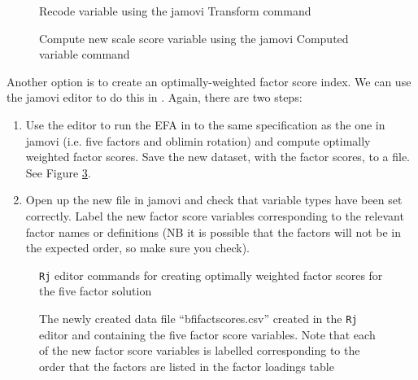 \begin{figure}[!htb]
\begin{center}
\caption{Recode variable using the jamovi Transform command}
\label{fig:fa8}
\HR
\end{center}
\end{figure}

\begin{figure}[!htb]
\begin{center}
\caption{Compute new scale score variable using the jamovi Computed variable command}
\label{fig:fa9}
\HR
\end{center}
\end{figure}

Another option is to create an optimally-weighted factor score index. We can use the jamovi  editor to do this in . Again, there are two steps:

\begin{enumerate} \itemsep -2pt
\item Use the  editor to run the EFA in  to the same specification as the one in jamovi (i.e. five factors and oblimin rotation) and compute optimally weighted factor scores. Save the new dataset, with the factor scores, to a file. See Figure \ref{fig:fa10}.
\item Open up the new file in jamovi and check that variable types have been set correctly. Label the new factor score variables corresponding to the relevant factor names or definitions (NB it is possible that the factors will not be in the expected order, so make sure you check).
\end{enumerate}

\begin{figure}[!htp]
\begin{center}
\caption{\texttt{Rj} editor commands for creating optimally weighted factor scores for the five factor solution}
\label{fig:fa10}
\HR
\end{center}
\end{figure}

\begin{figure}[!htp]
\begin{center}
\caption{The newly created data file “bfifactscores.csv” created in the \texttt{Rj} editor and containing the five factor score variables. Note that each of the new factor score variables is labelled corresponding to the order that the factors are listed in the factor loadings table}
\label{fig:fa11}
\HR
\end{center}
\end{figure}

